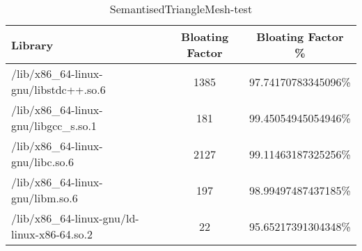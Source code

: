 \begin{table}[h]

\centering
\caption{SemantisedTriangleMesh-test}
\footnotesize
\begin{tabular}{l|c|c}
\toprule
Library & Bloating Factor & Bloating Factor \% \\ \midrule
\colorbox{gray!20}{/lib/x86\_64-linux-gnu/libstdc++.so.6} & 1385 & 97.74170783345096\% \\ \hline
\colorbox{gray!20}{/lib/x86\_64-linux-gnu/libgcc\_s.so.1} & 181 & 99.45054945054946\% \\ \hline
\colorbox{gray!20}{/lib/x86\_64-linux-gnu/libc.so.6} & 2127 & 99.11463187325256\% \\ \hline
\colorbox{gray!20}{/lib/x86\_64-linux-gnu/libm.so.6} & 197 & 98.99497487437185\% \\ \hline
/lib/x86\_64-linux-gnu/ld-linux-x86-64.so.2 & 22 & 95.65217391304348\% \\ \hline
\bottomrule
\end{tabular}
\end{table}

